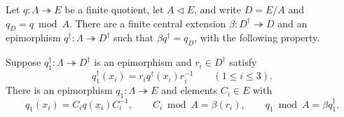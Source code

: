 \begin{lemma}\label{lem:finite-peripheral-refinement}
Let $q:\Lambda\twoheadrightarrow E$ be a finite quotient, let
$A\triangleleft E$, and write $D=E/A$ and $q_D=q\bmod A$.
There are a finite central extension
$\beta:D^\dagger\twoheadrightarrow D$ and an epimorphism
$q^\dagger:\Lambda\twoheadrightarrow D^\dagger$ such that
$\beta q^\dagger=q_D$, with the following property.

Suppose $q_1^\dagger:\Lambda\twoheadrightarrow D^\dagger$ is an
epimorphism and $r_i\in D^\dagger$ satisfy
\[
 q_1^\dagger(x_i)=r_iq^\dagger(x_i)r_i^{-1}
       \qquad(1\leq i\leq3).
\]
There is an epimorphism $q_1:\Lambda\twoheadrightarrow E$ and
elements $C_i\in E$ with
\[
 q_1(x_i)=C_iq(x_i)C_i^{-1},\qquad
 C_i\bmod A=\beta(r_i),\qquad
 q_1\bmod A=\beta q_1^\dagger.
\]
\end{lemma}

